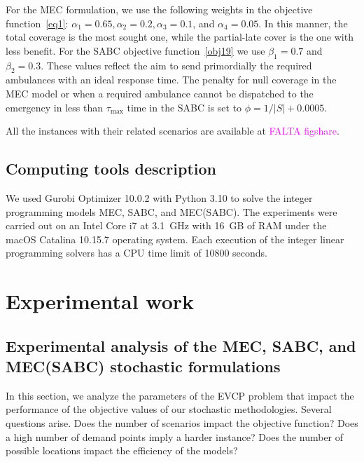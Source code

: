  For the MEC formulation, we use the following weights in the objective function~\eqref{eq1}: $\alpha_1= 0.65, \alpha_2= 0.2, \alpha_3= 0.1$, and $\alpha_4= 0.05$. In this manner, the total coverage is the most sought one, while the partial-late cover is the one with less benefit. For the SABC objective function~\eqref{obj19} we use $\beta_1 = 0.7$ and $\beta_2 = 0.3$. These values reflect the aim to send primordially the required ambulances with an ideal response time. The penalty for null coverage in the MEC model or when a required ambulance cannot be dispatched to the emergency in less than $\tau_{\max}$ time in the SABC is set to $\phi =   1/ |S|  + 0.0005$.

All the instances with their related scenarios are available at \textcolor{magenta}{FALTA figshare}.

\section{Computing tools description}
We used Gurobi Optimizer 10.0.2 with Python 3.10 to solve the integer programming models MEC, SABC, and MEC(SABC).
The experiments were carried out on an Intel Core i7 at 3.1~GHz with 16~GB of RAM under the macOS Catalina 10.15.7 operating system. Each execution of the integer linear programming solvers has a CPU time limit of 10800 seconds. 



\chapter{Experimental work}\label{cap:exper}

\section{Experimental analysis of the MEC, SABC, and MEC(SABC) stochastic formulations} \label{obj val}


In this section, we analyze the parameters of the EVCP problem that impact the performance of the objective values of our stochastic methodologies. Several questions arise. Does the number of scenarios impact the objective function? Does a high number of demand points imply a harder instance? Does the number of possible locations impact the efficiency of the models? 

